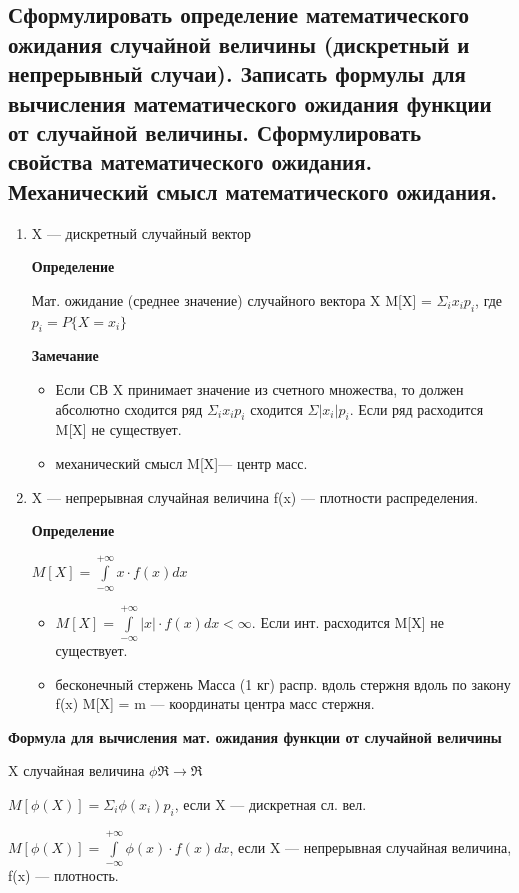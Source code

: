 \subsection{Сформулировать определение математического ожидания случайной величины (дискретный и непрерывный случаи). Записать формулы для вычисления математического ожидания функции от случайной величины. Сформулировать свойства математического ожидания. Механический смысл математического ожидания.}

\begin{enumerate}[label=\Roman*]
	\item X --- дискретный случайный вектор
	
	\textbf{Определение}
	
	Мат. ожидание (среднее значение) случайного вектора X M[X] = $\Sigma_ix_i p_i$, где $p_i=P\{X=x_i\}$
	
	\textbf{Замечание}
	
	\begin{itemize}
		\item Если СВ X принимает значение из счетного множества, то должен абсолютно сходится ряд $\Sigma_ix_ip_i$ сходится $\Sigma|{x_i}|p_i$. Если ряд расходится M[X] не существует.
		\item механический смысл M[X]--- центр масс. 
	\end{itemize}

	\item X --- непрерывная случайная величина f(x) --- плотности распределения.
	
	\textbf{Определение}
	
	$M[X] = \int\limits_{-\infty}^{+\infty} x \cdot f(x)dx$
	\begin{itemize}
		\item $M[X] = \int\limits_{-\infty}^{+\infty} |x| \cdot f(x)dx < \infty$. Если инт. расходится M[X] не существует.
		\item бесконечный стержень Масса (1 кг) распр. вдоль стержня вдоль по закону f(x) M[X] = m --- координаты центра масс стержня. 
	\end{itemize}
\end{enumerate}

\textbf{Формула для вычисления мат. ожидания функции от случайной величины}

X случайная величина $\phi \Re \rightarrow \Re$ 

$M[\phi(X)] = \Sigma_i\phi(x_i)p_i$, если X --- дискретная сл. вел.

$M[\phi(X)] = \int\limits_{-\infty}^{+\infty} \phi(x) \cdot f(x)dx$, если X --- непрерывная случайная величина, f(x) --- плотность.

